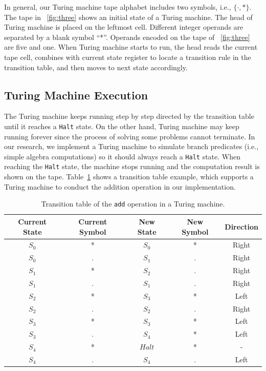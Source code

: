 In general, our Turing machine tape alphabet includes two symbols, i.e.,
$\{\cdot,*\}$. The tape in \F~\ref{fig:three} shows an initial state of a Turing
machine. The head of Turing machine is placed on the leftmost cell. Different
integer operands are separated by a blank symbol ``*''. Operands encoded on
the tape of \F~\ref{fig:three} are five and one. When Turing machine starts to
run, the head reads the current tape cell, combines with current state register
to locate a transition rule in the transition table, and then moves to next
state accordingly.

\subsection{Turing Machine Execution}
The Turing machine keeps running step by step directed by the transition table
until it reaches a \texttt{Halt} state. On the other hand, Turing machine may
keep running forever since the process of solving some problems cannot
terminate. In our research, we implement a Turing machine to simulate branch
predicates (i.e., simple algebra computations) so it should always reach a
\texttt{Halt} state. When reaching the \texttt{Halt} state, the machine stops
running and the computation result is shown on the tape. Table~\ref{table:1}
shows a transition table example, which supports a Turing machine to conduct the
addition operation in our implementation.

\begin{table}
\centering
\begin{tabular}{ |c|c|c|c|c|} 
  \hline
  \textbf{Current State} & \textbf{Current Symbol} & \textbf{New State} & \textbf{New Symbol} & \textbf{Direction} \\ 
  \hline
  \(S_0\) & * & \(S_0\) & * & Right\\ 
  \hline
  \(S_0\) & . &\(S_1\)  & . & Right\\
  \hline
  \(S_1\) & * &\(S_2\) & . & Right\\  
  \hline
  \(S_1\) & . & \(S_1\) & . & Right \\
  \hline
  \(S_2\) & * & \(S_3\) & * & Left \\
  \hline
  \(S_2\) & . & \(S_2\) & . & Right \\
  \hline
  \(S_3\) & * & \(S_3\) & * & Left \\
  \hline
  \(S_3\) & . & \(S_4\) & * & Left \\
  \hline
  \(S_4\) & * & \(Halt\) & * & - \\
  \hline
  \(S_4\) & . & \(S_4\) & . & Left\\
  \hline

\end{tabular}
\caption{Transition table of the \texttt{add} operation in a Turing machine.}
\label{table:1}
\end{table}

